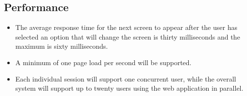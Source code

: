 \subsection{Performance}
\begin{itemize}
\item The average response time for the next screen to appear after the user has selected an option that will change the screen is thirty milliseconds and the maximum is sixty milliseconds.
\item A minimum of one page load per second will be supported.
\item Each individual session will support one concurrent user, while the overall system will support up to twenty users using the web application in parallel.
\end{itemize}

